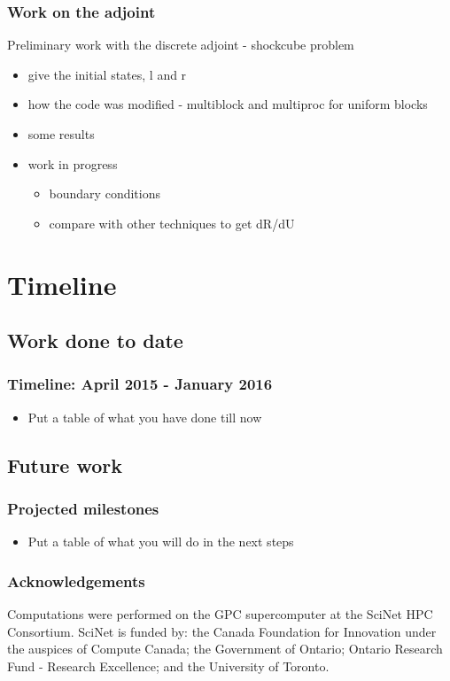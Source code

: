 \documentclass{beamer}
\begin{document}
\begin{frame}
\frametitle{Work on the adjoint}
Preliminary work with the discrete adjoint - shockcube problem
\begin{itemize}
\scriptsize
\item give the initial states, l and r
\item how the code was modified - multiblock and multiproc for uniform blocks
\item some results
\item work in progress
\begin{itemize}
\scriptsize
\item boundary conditions
\item compare with other techniques to get dR/dU
\end{itemize}
\end{itemize}

\end{frame}


\section[Timeline]{Timeline}

\subsection[Present]{Work done to date}
\begin{frame}%
\frametitle{Timeline: April 2015  - January 2016}
\scriptsize
\begin{itemize}
\item Put a table of what you have done till now
\end{itemize}
\end{frame}


\subsection[Future]{Future work}
\begin{frame}%
\frametitle{Projected milestones}
\scriptsize
\begin{itemize}
\item Put a table of what you will do in the next steps
\end{itemize}
\end{frame}


\begin{frame}
\frametitle{Acknowledgements}
\begin{center}
Computations were performed on the GPC supercomputer at the SciNet HPC Consortium. SciNet is funded by: the Canada Foundation for Innovation under the auspices of Compute Canada; the Government of Ontario; Ontario Research Fund - Research Excellence; and the University of Toronto. 
\end{center}
\end{frame}
\end{document}
